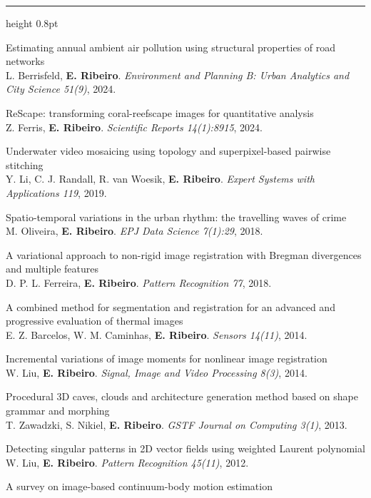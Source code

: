 \documentclass[11pt]{article}
\newcommand{\cvsection}[1]{%
  \vspace{12pt}%
  {\normalfont\large\scshape\textls[120]{#1}}\par
  \vspace{2pt}\hrule height 0.8pt\vspace{7pt}}
\newcommand{\cvsubsection}[1]{%
  \vspace{6pt}{\normalfont\scshape #1}\par\vspace{3pt}}
\begin{document}
\cvsection{Publications}
\cvsubsection{Journal Articles}
\begin{cvitems}
  \item Estimating annual ambient air pollution using structural properties of road networks\\
  L. Berrisfeld, \textbf{E. Ribeiro}. \textit{Environment and Planning B: Urban Analytics and City Science 51(9)}, 2024.
  \item ReScape: transforming coral-reefscape images for quantitative analysis\\
  Z. Ferris, \textbf{E. Ribeiro}. \textit{Scientific Reports 14(1):8915}, 2024.
  \item Underwater video mosaicing using topology and superpixel-based pairwise stitching\\
  Y. Li, C. J. Randall, R. van Woesik, \textbf{E. Ribeiro}. \textit{Expert Systems with Applications 119}, 2019.
  \item Spatio-temporal variations in the urban rhythm: the travelling waves of crime\\
  M. Oliveira, \textbf{E. Ribeiro}. \textit{EPJ Data Science 7(1):29}, 2018.
  \item A variational approach to non-rigid image registration with Bregman divergences and multiple features\\
  D. P. L. Ferreira, \textbf{E. Ribeiro}. \textit{Pattern Recognition 77}, 2018.
  \item A combined method for segmentation and registration for an advanced and progressive evaluation of thermal images\\
  E. Z. Barcelos, W. M. Caminhas, \textbf{E. Ribeiro}. \textit{Sensors 14(11)}, 2014.
  \item Incremental variations of image moments for nonlinear image registration\\
  W. Liu, \textbf{E. Ribeiro}. \textit{Signal, Image and Video Processing 8(3)}, 2014.
  \item Procedural 3D caves, clouds and architecture generation method based on shape grammar and morphing\\
  T. Zawadzki, S. Nikiel, \textbf{E. Ribeiro}. \textit{GSTF Journal on Computing 3(1)}, 2013.
  \item Detecting singular patterns in 2D vector fields using weighted Laurent polynomial\\
  W. Liu, \textbf{E. Ribeiro}. \textit{Pattern Recognition 45(11)}, 2012.
  \item A survey on image-based continuum-body motion estimation\\

\end{cvitems}
\end{document}
